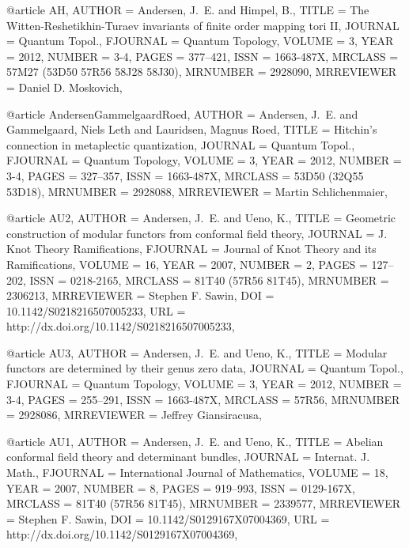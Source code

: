 @article {AH,
    AUTHOR = {Andersen, J.~E. and Himpel, B.},
     TITLE = {The {W}itten-{R}eshetikhin-{T}uraev invariants of finite order
              mapping tori {II}},
   JOURNAL = {Quantum Topol.},
  FJOURNAL = {Quantum Topology},
    VOLUME = {3},
      YEAR = {2012},
    NUMBER = {3-4},
     PAGES = {377--421},
      ISSN = {1663-487X},
   MRCLASS = {57M27 (53D50 57R56 58J28 58J30)},
  MRNUMBER = {2928090},
MRREVIEWER = {Daniel D. Moskovich},
}

@article {AndersenGammelgaardRoed,
    AUTHOR = {Andersen, J.~E. and Gammelgaard, Niels Leth and
              Lauridsen, Magnus Roed},
     TITLE = {Hitchin's connection in metaplectic quantization},
   JOURNAL = {Quantum Topol.},
  FJOURNAL = {Quantum Topology},
    VOLUME = {3},
      YEAR = {2012},
    NUMBER = {3-4},
     PAGES = {327--357},
      ISSN = {1663-487X},
   MRCLASS = {53D50 (32Q55 53D18)},
  MRNUMBER = {2928088},
MRREVIEWER = {Martin Schlichenmaier},
}

@article {AU2,
    AUTHOR = {Andersen, J.~E. and Ueno, K.},
     TITLE = {Geometric construction of modular functors from conformal
              field theory},
   JOURNAL = {J. Knot Theory Ramifications},
  FJOURNAL = {Journal of Knot Theory and its Ramifications},
    VOLUME = {16},
      YEAR = {2007},
    NUMBER = {2},
     PAGES = {127--202},
      ISSN = {0218-2165},
   MRCLASS = {81T40 (57R56 81T45)},
  MRNUMBER = {2306213},
MRREVIEWER = {Stephen F. Sawin},
       DOI = {10.1142/S0218216507005233},
       URL = {http://dx.doi.org/10.1142/S0218216507005233},
}


@article {AU3,
    AUTHOR = {Andersen, J.~E. and Ueno, K.},
     TITLE = {Modular functors are determined by their genus zero data},
   JOURNAL = {Quantum Topol.},
  FJOURNAL = {Quantum Topology},
    VOLUME = {3},
      YEAR = {2012},
    NUMBER = {3-4},
     PAGES = {255--291},
      ISSN = {1663-487X},
   MRCLASS = {57R56},
  MRNUMBER = {2928086},
MRREVIEWER = {Jeffrey Giansiracusa},
}

@article {AU1,
    AUTHOR = {Andersen, J.~E. and Ueno, K.},
     TITLE = {Abelian conformal field theory and determinant bundles},
   JOURNAL = {Internat. J. Math.},
  FJOURNAL = {International Journal of Mathematics},
    VOLUME = {18},
      YEAR = {2007},
    NUMBER = {8},
     PAGES = {919--993},
      ISSN = {0129-167X},
   MRCLASS = {81T40 (57R56 81T45)},
  MRNUMBER = {2339577},
MRREVIEWER = {Stephen F. Sawin},
       DOI = {10.1142/S0129167X07004369},
       URL = {http://dx.doi.org/10.1142/S0129167X07004369},
}

